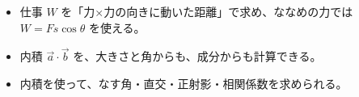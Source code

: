 \makeatletter
\newcommand\bkivmstep[2]{\par\addvspace{6pt}\Needspace{5\baselineskip}\noindent
  {\bkcircled[bkOrange]{#1}\enspace\sffamily\bfseries\color{bkOrange!75!black}#2}\par\nobreak\vspace{2pt}}
\newcommand\bkivmline[1]{\par\addvspace{3pt}{\centering #1\par}\addvspace{3pt}\noindent\ignorespaces}
\newcommand\bkivmmidashi[1]{\par\addvspace{4pt}\Needspace{5\baselineskip}\noindent\textbf{#1}\par\nobreak}
\newcommand\bkivmcart[1]{\begin{scope}[shift={#1}]
  \filldraw[fill=bkOrange!35, draw=bkOrange!70!black, line width=0.6pt] (0,3) -- (16,3) -- (17.5,11) -- (-1.5,11) -- cycle;
  \fill[bkInk!80] (3.5,2.6) circle (2.4) (12.5,2.6) circle (2.4);
  \fill[bkLine] (3.5,2.6) circle (0.9) (12.5,2.6) circle (0.9);\end{scope}}
\makeatother
{}


\begin{goal}
\begin{itemize}[label={\color{\bkTT}●}, leftmargin=1.6\zw, itemsep=0pt, topsep=1pt]
\item {}\enspace 仕事 $W$ を「力×力の向きに動いた距離」で求め、ななめの力では $W=Fs\cos\theta$ を使える。
\item {}\enspace 内積 $\vec{a}\cdot\vec{b}$ を、大きさと角からも、成分からも計算できる。
\item {}\enspace 内積を使って、なす角・直交・正射影・相関係数を求められる。
\end{itemize}
\end{goal}

